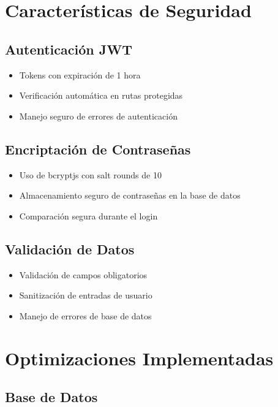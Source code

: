 \documentclass[12pt,a4paper]{article}
\begin{document}
\section{Características de Seguridad}

\subsection{Autenticación JWT}

\begin{itemize}
    \item Tokens con expiración de 1 hora
    \item Verificación automática en rutas protegidas
    \item Manejo seguro de errores de autenticación
\end{itemize}

\subsection{Encriptación de Contraseñas}

\begin{itemize}
    \item Uso de bcryptjs con salt rounds de 10
    \item Almacenamiento seguro de contraseñas en la base de datos
    \item Comparación segura durante el login
\end{itemize}

\subsection{Validación de Datos}

\begin{itemize}
    \item Validación de campos obligatorios
    \item Sanitización de entradas de usuario
    \item Manejo de errores de base de datos
\end{itemize}

\section{Optimizaciones Implementadas}

\subsection{Base de Datos}
\end{document}
